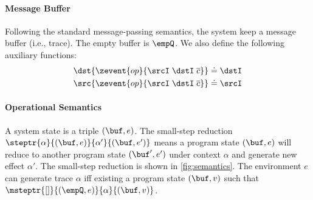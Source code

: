 \paragraph{Message Buffer} Following the standard message-passing semantics, the system keep a message buffer (i.e., trace). The empty buffer is $\empQ$. We also define the following auxiliary functions:
\begin{align*}
    \dst{\zevent{op}{\srcI\;\dstI\;\overline{c}}} &\doteq \dstI \\
    \src{\zevent{op}{\srcI\;\dstI\;\overline{c}}} &\doteq \srcI \\
\end{align*}

\paragraph{Operational Semantics} A system state is a triple $(\buf, e)$. The small-step reduction $\steptr{\alpha}{(\buf, e)}{\alpha'}{(\buf, e')}$ means a program state $(\buf, e)$ will reduce to another program state $(\buf', e')$ under context $\alpha$ and generate new effect $\alpha'$.
The small-step reduction is shown in \autoref{fig:semantics}. The environment $e$ can generate trace $\alpha$ iff existing a program state $(\buf, v)$ such that $\msteptr{[]}{(\empQ, e)}{\alpha}{(\buf, v)}$.

